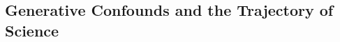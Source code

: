 \documentclass[11pt, oneside]{article}   	%
\begin{document}





\subsection{Generative Confounds and the Trajectory of Science}




\end{document}
